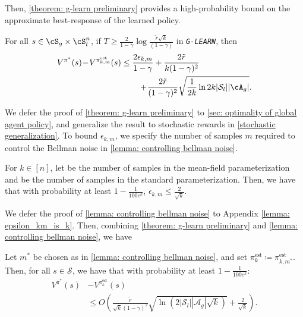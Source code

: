Then, \cref{theorem: g-learn preliminary} provides a high-probability bound on the approximate best-response of the learned policy.

\begin{theorem}\label{theorem: g-learn preliminary} For all $s\in\cS_g\times\cS_l^n$, if $T\geq\frac{2}{1-\gamma}\log\frac{\tilde{r}\sqrt{k}}{(1-\gamma)}$ in \emph{\texttt{G-LEARN}}, then
\begin{align*}V^{\pi^*}(s)\!&-\! V^{{{\pi}}^\est_{k,m}}(s) \leq \frac{2\epsilon_{k,m}}{1-\gamma} + \frac{2\tilde{r}}{k(1-\gamma)^2}\!\\
&\quad\quad\quad\quad\quad\quad\quad+\! \frac{2\tilde{r}}{(1-\gamma)^2}\sqrt{\frac{1}{2k} \ln 2k |\mathcal{S}_l||\cA_g|}.
\end{align*}
\end{theorem}
We defer the proof of \cref{theorem: g-learn preliminary} to \cref{sec: optimality of global agent policy}, and generalize the result to stochastic rewards in \cref{stochastic generalization}. To bound $\epsilon_{k,m}$, we specify the number of samples $m$ required to control the Bellman noise in \cref{lemma: controlling bellman noise}.

\begin{lemma}
    \label{lemma: controlling bellman noise} For $k\in[n]$, let  be the number of samples in the mean-field parameterization and  be the number of samples in the standard parameterization. Then, we have that with probability at least $1-\frac{1}{100e^k}$,  $\epsilon_{k,m}\leq \frac{2}{\sqrt{k}}$.
\end{lemma}
We defer the proof of \cref{lemma: controlling bellman noise} to Appendix \ref{lemma: epsilon_km_is_k}. Then, combining \cref{theorem: g-learn preliminary} and \cref{lemma: controlling bellman noise},  we have

\begin{theorem}
     \label{theorem: g-learn}
    Let $m^*$ be chosen as in \cref{lemma: controlling bellman noise}, and set $\pi_{k}^{\text{est}} \coloneqq \pi^{\text{est}}_{k,m^*}$. Then, for all $s\in\mathcal{S}$, we have that with probability at least $1-\frac{1}{100e^k}$: \label{theorem: application of PDL}
\begin{align*}V^{\pi^*}(s) &- V^{{{\pi}}^\text{est}_{k}}(s) \\ &\leq {O}\left(\frac{\tilde{r}}{\sqrt{k}(1-\gamma)^2}\sqrt{ \ln(2|\mathcal{S}_l||\mathcal{A}_g|\sqrt{k})} + \frac{2}{\sqrt{k}}\right).
\end{align*}
\end{theorem}

